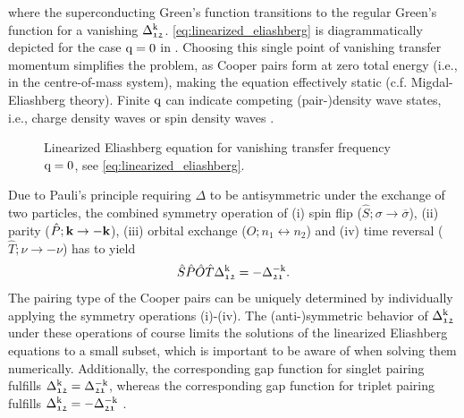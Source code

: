 \documentclass[\main/main.tex]{subfiles}
\begin{document}
where the superconducting Green's function transitions to the regular Green's function for a vanishing $\Delta_{\mathfrak{12}}^{\text{k}}$. \eqref{eq:linearized_eliashberg} is diagrammatically depicted for the case $\text{q}=0$ in . Choosing this single point of vanishing transfer momentum simplifies the problem, as Cooper pairs form at zero total energy (i.e., in the centre-of-mass system), making the equation effectively static (c.f. Migdal-Eliashberg theory). Finite $\text{q}$ can indicate competing (pair-)density wave states, i.e., charge density waves or spin density waves \cite{Yoshida2021}.
\begin{figure}[ht!]
	\centering
  	
  	\caption{Linearized Eliashberg equation for vanishing transfer frequency $\text{q}=0$, see \eqref{eq:linearized_eliashberg}.}
  	\label{fig:linearized_eliashberg}
\end{figure}

Due to Pauli's principle requiring $\Delta$ to be antisymmetric under the exchange of two particles, the combined symmetry operation of (i) spin flip ($\hat S; \sigma\to\overline{\sigma}$), (ii) parity ($\hat P; \textbf{k}\to-\textbf{k}$), (iii) orbital exchange ($\hat O; n_1 \leftrightarrow n_2$) and (iv) time reversal ($\hat T; \nu\to-\nu$) has to yield \cite{Riseborough2004}
\begin{align}
	\hat S\hat P\hat O\hat T \Delta_{\mathfrak{12}}^{\text{k}} = -\Delta_{\mathfrak{21}}^{-\text{k}}.
\end{align}
The pairing type of the Cooper pairs can be uniquely determined by individually applying the symmetry operations (i)-(iv). The (anti-)symmetric behavior of $\Delta_{\mathfrak{12}}^{\text{k}}$ under these operations of course limits the solutions of the linearized Eliashberg equations to a small subset, which is important to be aware of when solving them numerically. Additionally, the corresponding gap function for singlet pairing fulfills $\Delta^{\text{k}}_{\mathfrak{12}}=\Delta^{-\text{k}}_{\mathfrak{21}}$, whereas the corresponding gap function for triplet pairing fulfills $\Delta^{\text{k}}_{\mathfrak{12}}=-\Delta_{\mathfrak{21}}^{-\text{k}}$ \cite{Nourafkan2016}.
\end{document}
